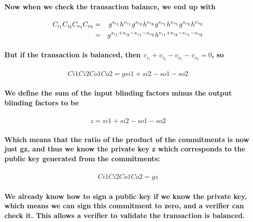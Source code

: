 \documentclass{article}
\begin{document}
\paragraph{Now when we check the transaction balance, we end up with}

\begin{eqnarray}
  C_{i_1} C_{i_2} C_{o_1} C_{o_2} &=& g^{s_{i_1}} h^{v_{i_1}} g^{s_{i_2}} h^{v_{i_2}} g^{s_{o_1}} h^{v_{o_1}} g^{s_{o_2}} h^{v_{o_2}}
  \cr &=& g^{s_{i_1} + s_{i_2} - s_{o_1} - s_{o_2}} h^{v_{i_1} + v_{i_2} - v_{o_1} - v_{o_2}}
\end{eqnarray}

\paragraph{But if the transaction is balanced, then $v_{i_1} + v_{i_2} - v_{o_1} - v_{o_2} =0$, so}

\begin{eqnarray}
  Ci1Ci2Co1Co2=gsi1+ si2- so1- so2
\end{eqnarray}

\paragraph{We define the sum of the input blinding factors minus the output blinding factors to be}

\begin{eqnarray}
  z=si1+ si2- so1- so2
\end{eqnarray}

\paragraph{Which means that the ratio of the product of the commitments is now just gz, and thus we know the private key z which corresponds to the public key generated from the commitments:}

\begin{eqnarray}
  Ci1Ci2Co1Co2=gz
\end{eqnarray}

\paragraph{We already know how to sign a public key if we know the private key, which means we can sign this commitment to zero, and a verifier can check it.  This allows a verifier to validate the transaction is balanced.}
\end{document}
